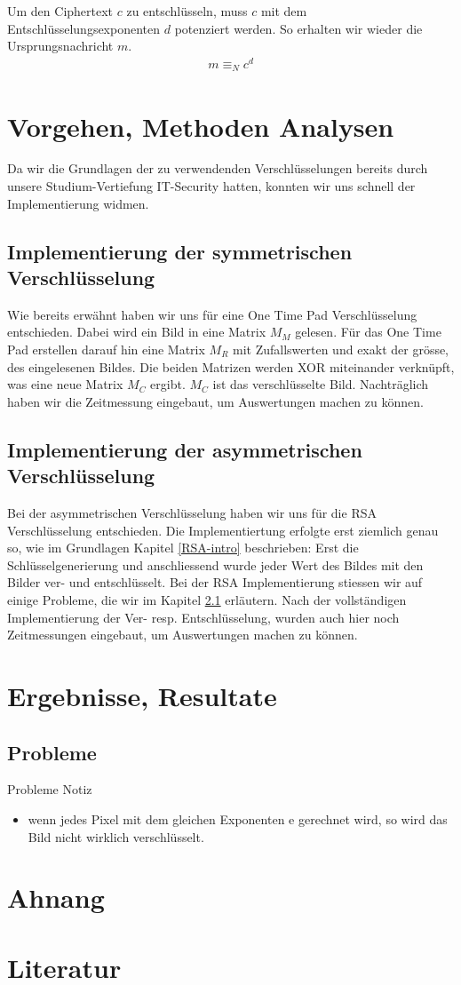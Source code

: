 \documentclass[paper=a4,fontsize=12pt]{scrartcl}
\begin{document}
Um den Ciphertext $c$ zu entschlüsseln, muss $c$ mit dem Entschlüsselungsexponenten $d$ potenziert werden.
So erhalten wir wieder die Ursprungsnachricht $m$.
\begin{align}
	m \equiv_N c^d
\end{align}



\newpage
\section{Vorgehen, Methoden Analysen}
Da wir die Grundlagen der zu verwendenden Verschlüsselungen bereits durch unsere Studium-Vertiefung IT-Security hatten,
konnten wir uns schnell der Implementierung widmen.

\subsection{Implementierung der symmetrischen Verschlüsselung}
Wie bereits erwähnt haben wir uns für eine One Time Pad Verschlüsselung entschieden.
Dabei wird ein Bild in eine Matrix $M_M$ gelesen. 
Für das One Time Pad erstellen darauf hin eine Matrix $M_R$ mit Zufallswerten und exakt der grösse, des eingelesenen Bildes.
Die beiden Matrizen werden XOR miteinander verknüpft, was eine neue Matrix $M_C$ ergibt. $M_C$ ist das verschlüsselte Bild.
Nachträglich haben wir die Zeitmessung eingebaut, um Auswertungen machen zu können.

\subsection{Implementierung der asymmetrischen Verschlüsselung}
Bei der asymmetrischen Verschlüsselung haben wir uns für die RSA Verschlüsselung entschieden.
Die Implementiertung erfolgte erst ziemlich genau so, wie im Grundlagen Kapitel \ref{RSA-intro} beschrieben:
Erst die Schlüsselgenerierung und anschliessend wurde jeder Wert des Bildes mit den Bilder ver- und entschlüsselt.
Bei der RSA Implementierung stiessen wir auf einige Probleme, die wir im Kapitel \ref{problems-RSA} erläutern.
Nach der vollständigen Implementierung der Ver- resp. Entschlüsselung, wurden auch hier noch Zeitmessungen eingebaut, um Auswertungen
machen zu können.

\newpage
\section{Ergebnisse, Resultate} \label{results} 
 
 \subsection{Probleme} \label{problems-RSA}
 Probleme Notiz
 \begin{itemize}
  \item wenn jedes Pixel mit dem gleichen Exponenten e gerechnet wird, so wird das Bild nicht wirklich verschlüsselt.
\end{itemize}
\newpage
\section{Ahnang}

\newpage
\section{Literatur}
\end{document}
